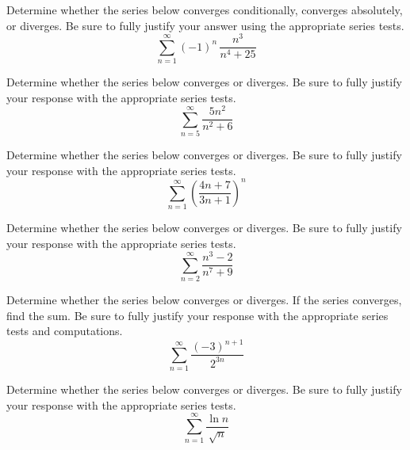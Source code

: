 \documentclass[12pt,letterpaper]{exam}
\begin{document}
\examtitle
{} 
\scores
\bottomline
\newpage


\begin{questions}

\newpage
\question[25] Determine whether the series below converges conditionally, converges absolutely, or diverges. Be sure to fully justify your answer using the appropriate series tests.
	\[
	\sum_{n=1}^\infty (-1)^n \, \dfrac{n^3}{n^4 + 25}
	\]



\newpage
\question[10] Determine whether the series below converges or diverges. Be sure to fully justify your response with the appropriate series tests.
	\[
	\sum_{n=5}^\infty \dfrac{5n^2}{n^2 + 6}
	\]



\newpage
\question[10] Determine whether the series below converges or diverges. Be sure to fully justify your response with the appropriate series tests.
	\[
	\sum_{n=1}^\infty \left( \dfrac{4n + 7}{3n + 1} \right)^n
	\]



\newpage
\question[10] Determine whether the series below converges or diverges. Be sure to fully justify your response with the appropriate series tests.
	\[
	\sum_{n=2}^\infty \dfrac{n^3 - 2}{n^7 + 9}
	\]



\newpage
\question[10] Determine whether the series below converges or diverges. If the series converges, find the sum. Be sure to fully justify your response with the appropriate series tests and computations. 
	\[
	\sum_{n=1}^\infty \dfrac{(-3)^{n + 1}}{2^{3n}}
	\]



\newpage
\question[10] Determine whether the series below converges or diverges. Be sure to fully justify your response with the appropriate series tests.
	\[
	\sum_{n=1}^\infty \dfrac{\ln n}{\sqrt{n}}
	\]




\end{questions}
\end{document}
